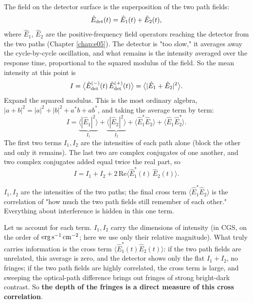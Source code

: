 The field on the detector surface is the superposition of the two path fields:
\[
  \hat E_{\rm det}(t)=\hat E_1(t)+\hat E_2(t),
\]
where \(\hat E_1\), \(\hat E_2\) are the positive-frequency field operators reaching the detector from the two paths (Chapter \ref{chap:e05}). The detector is "too slow," it averages away the cycle-by-cycle oscillation, and what remains is the intensity averaged over the response time, proportional to the squared modulus of the field. So the mean intensity at this point is
\[
  I=\big\langle \hat E_{\rm det}^{(-)}(t)\,\hat E_{\rm det}^{(+)}(t)\big\rangle
   =\big\langle |\hat E_1+\hat E_2|^2\big\rangle .
\]
Expand the squared modulus. This is the most ordinary algebra, \(|a+b|^2=|a|^2+|b|^2+a^\ast b+ab^\ast\), and taking the average term by term:
\[
  I=\underbrace{\big\langle|\hat E_1|^2\big\rangle}_{I_1}
   +\underbrace{\big\langle|\hat E_2|^2\big\rangle}_{I_2}
   +\big\langle \hat E_1^\ast \hat E_2\big\rangle
   +\big\langle \hat E_1 \hat E_2^\ast\big\rangle .
\]
The first two terms \(I_1,I_2\) are the intensities of each path alone (block the other and only it remains). The last two are complex conjugates of one another, and two complex conjugates added equal twice the real part, so
\begin{equation}
  I=I_1+I_2+2\,\mathrm{Re}\big\langle \hat E_1^\ast(t)\,\hat E_2(t)\big\rangle .
  \label{eq:e09-interference-raw}
\end{equation}
\begin{formulaexplain}
\(I_1,I_2\) are the intensities of the two paths; the final cross term \(\langle\hat E_1^\ast\hat E_2\rangle\) is the correlation of "how much the two path fields still remember of each other." Everything about interference is hidden in this one term.
\end{formulaexplain}

Let us account for each term. \(I_1,I_2\) carry the dimensions of intensity (in CGS, on the order of \({\rm erg\,s^{-1}\,cm^{-2}}\); here we use only their relative magnitude). What truly carries information is the cross term \(\langle\hat E_1^\ast(t)\hat E_2(t)\rangle\): if the two path fields are unrelated, this average is zero, and the detector shows only the flat \(I_1+I_2\), no fringes; if the two path fields are highly correlated, the cross term is large, and sweeping the optical-path difference brings out fringes of strong bright-dark contrast. So \textbf{the depth of the fringes is a direct measure of this cross correlation}.

